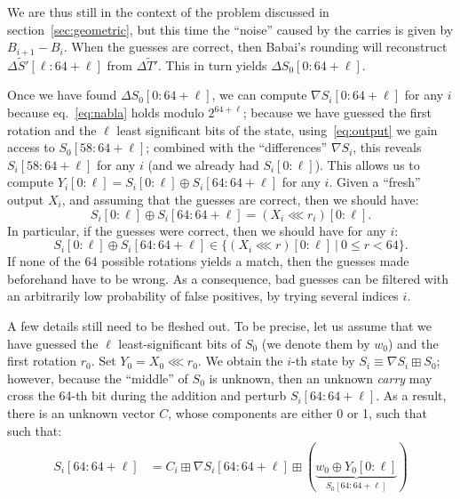 \documentclass[submission,svgnames,journal=tosc]{iacrtrans}
\begin{document}
We are thus still in the context of the problem discussed in
section~\ref{sec:geometric}, but this time the ``noise'' caused by the carries
is given by $B_{i+1} - B_i$. When the guesses are correct, then Babai's rounding
will reconstruct $\Delta \widetilde{S}'[\ell:64+\ell]$ from
$\Delta \widetilde{T}'$. This in turn yields $\Delta S_0[0:64+\ell]$.

Once we have found $\Delta S_0[0:64+\ell]$, we can compute
$\nabla S_i[0:64+\ell]$ for any $i$ because eq.~\eqref{eq:nabla} holds modulo
$2^{64+\ell}$; because we have guessed the first rotation and the $\ell$ least
significant bits of the state, using~\eqref{eq:output} we gain access to
$S_0[58:64+\ell]$; combined with the ``differences'' $\nabla S_i$, this reveals
$S_i[58:64+\ell]$ for any $i$ (and we already had $S_i[0:\ell]$). This allows us
to compute $Y_i[0:\ell] = S_i[0:\ell] \oplus S_i[64:64+\ell]$ for any $i$. Given
a ``fresh'' output $X_i$, and assuming that the guesses are correct, then we
should have:
\begin{equation}\label{eq:find_rotation}
  S_i[0:\ell] \oplus S_i[64:64+\ell] = (X_i \lll r_i)[0:\ell].
\end{equation}
In particular, if the guesses were correct, then we should have for any $i$:
\begin{equation}\label{eq:consistency}
  S_i[0:\ell] \oplus S_i[64:64+\ell] \in \bigl\{ (X_i \lll r)[0:\ell]~|~0 \leq r < 64 \bigr\}.
\end{equation}
If none of the 64 possible rotations yields a match, then the guesses made
beforehand have to be wrong. As a consequence, bad guesses can be filtered with
an arbitrarily low probability of false positives, by trying several indices
$i$.

A few details still need to be fleshed out. To be precise, let us assume that we
have guessed the $\ell$ least-significant bits of $S_0$ (we denote them by
$w_0$) and the first rotation $r_0$. Set $Y_0 = X_0 \lll r_0$. %
We obtain the $i$-th state by $S_i \equiv \nabla S_i \boxplus S_0$; however,
because the ``middle'' of $S_0$ is unknown, then an unknown \emph{carry} may
cross the 64-th bit during the addition and perturb $S_i[64:64+\ell]$. As a
result, there is an unknown vector $C$, whose components are either 0 or 1, such
that such that:
\begin{align*}
  S_i[64:64+\ell] &= C_i \boxplus \nabla S_i[64:64+\ell] \boxplus (\underbrace{w_0 \oplus Y_0[0:\ell]}_{S_0[64:64+\ell]}) \\
\end{align*}
\end{document}

